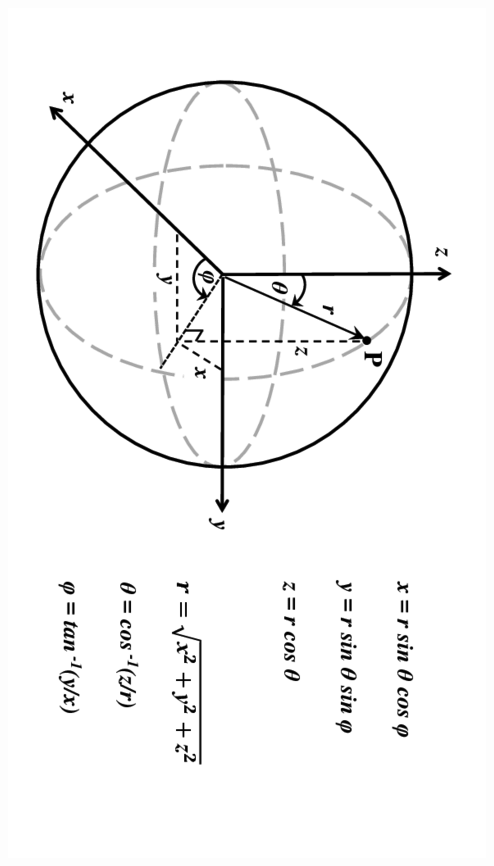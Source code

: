 \documentclass[a4paper,10pt,twocolumn,oneside]{article}
\begin{document}
\clearpage
\includegraphics[scale=0.9]{Spherical-coordinates.png}
\end{document}
